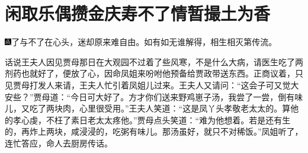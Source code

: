 

\chapter{闲取乐偶攒金庆寿\hspace{.5em}不了情暂撮土为香}


{\includegraphics[width=3mm]{../Images/00005}了与不了在心头，迷却原来难自由。如有如无谁解得，相生相灭第传流。}

话说王夫人因见贾母那日在大观园不过着了些风寒，不是什么大病，请医生吃了两剂药也就好了，便放了心，因命凤姐来吩咐他预备给贾政带送东西。正商议着，只见贾母打发人来请，王夫人忙引着凤姐儿过来。王夫人又请问：``这会子可又觉大安些？''贾母道：``今日可大好了。方才你们送来野鸡崽子汤，我尝了一尝，倒有味儿，又吃了两块肉，心里很受用。''王夫人笑道：``这是凤丫头孝敬老太太的。算他的孝心虔，不枉了素日老太太疼他。''贾母点头笑道：``难为他想着。若是还有生的，再炸上两块，咸浸浸的，吃粥有味儿。那汤虽好，就只不对稀饭。''凤姐听了，连忙答应，命人去厨房传话。

